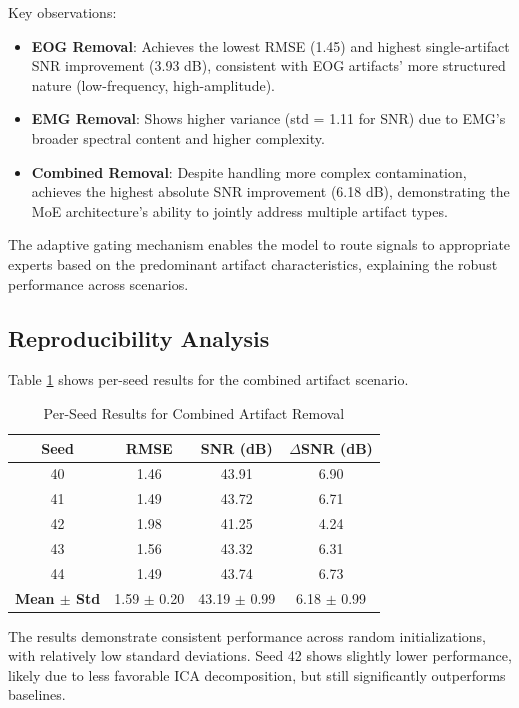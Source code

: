 \documentclass[journal]{IEEEtran}
\begin{document}
Key observations:
\begin{itemize}
\item \textbf{EOG Removal}: Achieves the lowest RMSE (1.45) and highest single-artifact SNR improvement (3.93 dB), consistent with EOG artifacts' more structured nature (low-frequency, high-amplitude).
\item \textbf{EMG Removal}: Shows higher variance (std = 1.11 for SNR) due to EMG's broader spectral content and higher complexity.
\item \textbf{Combined Removal}: Despite handling more complex contamination, achieves the highest absolute SNR improvement (6.18 dB), demonstrating the MoE architecture's ability to jointly address multiple artifact types.
\end{itemize}

The adaptive gating mechanism enables the model to route signals to appropriate experts based on the predominant artifact characteristics, explaining the robust performance across scenarios.

\subsection{Reproducibility Analysis}

Table \ref{tab:seeds} shows per-seed results for the combined artifact scenario.

\begin{table}[!t]
\centering
\caption{Per-Seed Results for Combined Artifact Removal}
\label{tab:seeds}
\begin{tabular}{cccc}
\toprule
\textbf{Seed} & \textbf{RMSE} & \textbf{SNR (dB)} & \textbf{$\Delta$SNR (dB)} \\
\midrule
40 & 1.46 & 43.91 & 6.90 \\
41 & 1.49 & 43.72 & 6.71 \\
42 & 1.98 & 41.25 & 4.24 \\
43 & 1.56 & 43.32 & 6.31 \\
44 & 1.49 & 43.74 & 6.73 \\
\midrule
\textbf{Mean $\pm$ Std} & 1.59 $\pm$ 0.20 & 43.19 $\pm$ 0.99 & 6.18 $\pm$ 0.99 \\
\bottomrule
\end{tabular}
\end{table}

The results demonstrate consistent performance across random initializations, with relatively low standard deviations. Seed 42 shows slightly lower performance, likely due to less favorable ICA decomposition, but still significantly outperforms baselines.
\end{document}
